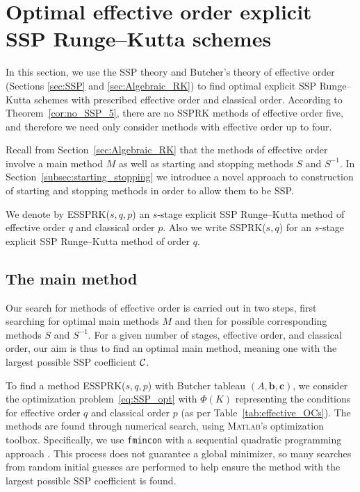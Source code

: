 \section{Optimal effective order explicit SSP Runge--Kutta schemes}\label{sec:optimal_ESSPRK}
In this section, we use the SSP theory and Butcher's theory of effective
order (Sections \ref{sec:SSP} and \ref{sec:Algebraic_RK}) to find
optimal explicit SSP Runge--Kutta schemes with prescribed effective
order and classical order.
According to Theorem~\ref{cor:no_SSP_5}, there are no SSPRK methods of
effective order five, and therefore we need only consider methods with
effective order up to four.

Recall from Section~\ref{sec:Algebraic_RK} that the methods of
effective order involve a main method $M$ as well as starting and
stopping methods $S$ and $S^{-1}$.
In Section~\ref{subsec:starting_stopping} we introduce a novel approach
to construction of starting and stopping methods in order to allow
them to be SSP.

We denote by ESSPRK($s,q,p$) an $s$-stage explicit SSP Runge--Kutta
method of effective order $q$ and classical order $p$.
Also we write SSPRK($s,q$) for an $s$-stage explicit SSP Runge--Kutta
method of order $q$.

\subsection{The main method}\label{subsec:main_method}

Our search for methods of effective order is carried out in two
steps, first searching for optimal main methods $M$ and then for
possible corresponding methods $S$ and $S^{-1}$.
For a given number of stages, effective order, and classical order,
our aim is thus to find an optimal main method, meaning one with the 
largest possible SSP coefficient $\mathcal{C}$.

To find a method ESSPRK($s,q,p$) with Butcher tableau $(A, \bm{b},
\bm{c})$, we consider the optimization problem~\eqref{eq:SSP_opt} 
with $\Phi(K)$ representing the conditions for effective order
$q$ and classical order $p$ (as per Table~\ref{tab:effective_OCs}).
The methods are found through numerical search, using 
\textsc{Matlab}'s optimization toolbox.
Specifically, we use \texttt{fmincon} with a sequential quadratic 
programming approach \cite{Ketcheson2008, Ketcheson/Macdonald/Gottlieb:2009}.
This process does not guarantee a global minimizer, so many searches 
from random initial guesses are performed to help ensure the method with
the largest possible SSP coefficient is found.

